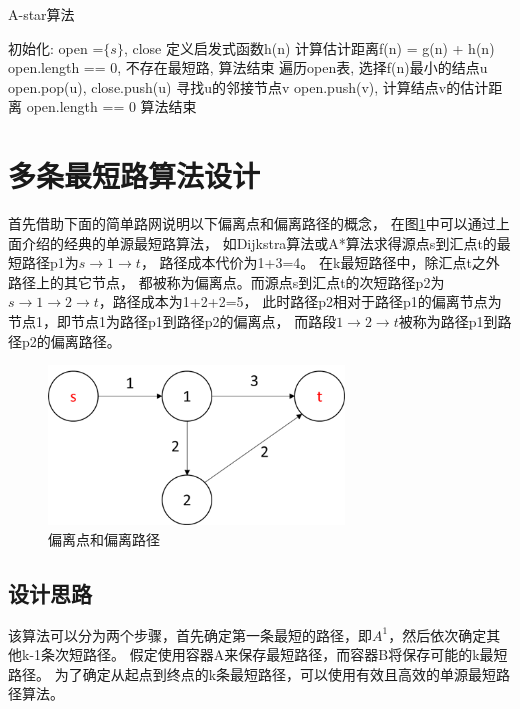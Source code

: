\begin{algorithm}
    \caption{A-star算法}
    \begin{algorithmic}[1]
        \STATE 初始化: open =$\{s\}$, close
        \STATE 定义启发式函数h(n)
        \STATE 计算估计距离f(n) = g(n) + h(n)
        \STATE open.length == 0, 不存在最短路, 算法结束
        \REPEAT
        \STATE 遍历open表, 选择f(n)最小的结点u
        \STATE open.pop(u), close.push(u)
        \STATE 寻找u的邻接节点v
        \STATE  open.push(v),
        \STATE  计算结点v的估计距离
        \UNTIL open.length == 0
        \STATE 算法结束
    \end{algorithmic}\label{alg:algorithm2}
\end{algorithm}


\section{多条最短路算法设计}\label{sec:多条最短路算法设计}
首先借助下面的简单路网说明以下偏离点和偏离路径的概念，
在图\ref{fig:fig12}中可以通过上面介绍的经典的单源最短路算法，
如Dijkstra算法或A*算法求得源点s到汇点t的最短路径p1为$s\to 1\to t$，
路径成本代价为1+3=4。
在k最短路径中，除汇点t之外路径上的其它节点，
都被称为偏离点。而源点s到汇点t的次短路径p2为$s\to 1\to 2\to t$，路径成本为1+2+2=5，
此时路径p2相对于路径p1的偏离节点为节点1，即节点1为路径p1到路径p2的偏离点，
而路段$1\to 2\to t$被称为路径p1到路径p2的偏离路径。
\begin{figure}[H] %
    \centering %
    \includegraphics[width=0.7\textwidth]{png/图片12偏离点和偏离路径} %
    \caption{偏离点和偏离路径} %
    \label{fig:fig12} %
\end{figure}

\subsection{设计思路}\label{subsec:设计思路}
该算法可以分为两个步骤，首先确定第一条最短的路径，即$A^1$，然后依次确定其他k-1条次短路径。
假定使用容器A来保存最短路径，而容器B将保存可能的k最短路径。
为了确定从起点到终点的k条最短路径，可以使用有效且高效的单源最短路径算法。

